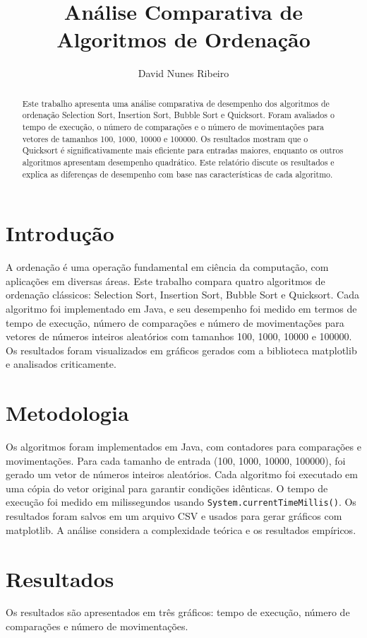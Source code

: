 \documentclass[12pt]{article}
\begin{document}
	
	\title{Análise Comparativa de Algoritmos de Ordenação}
	\author{David Nunes Ribeiro}
	\maketitle
	
	\begin{abstract}
		Este trabalho apresenta uma análise comparativa de desempenho dos algoritmos de ordenação Selection Sort, Insertion Sort, Bubble Sort e Quicksort. Foram avaliados o tempo de execução, o número de comparações e o número de movimentações para vetores de tamanhos 100, 1000, 10000 e 100000. Os resultados mostram que o Quicksort é significativamente mais eficiente para entradas maiores, enquanto os outros algoritmos apresentam desempenho quadrático. Este relatório discute os resultados e explica as diferenças de desempenho com base nas características de cada algoritmo.
	\end{abstract}
	
	\section{Introdução}
	A ordenação é uma operação fundamental em ciência da computação, com aplicações em diversas áreas. Este trabalho compara quatro algoritmos de ordenação clássicos: Selection Sort, Insertion Sort, Bubble Sort e Quicksort. Cada algoritmo foi implementado em Java, e seu desempenho foi medido em termos de tempo de execução, número de comparações e número de movimentações para vetores de números inteiros aleatórios com tamanhos 100, 1000, 10000 e 100000. Os resultados foram visualizados em gráficos gerados com a biblioteca matplotlib e analisados criticamente.
	
	\section{Metodologia}
	Os algoritmos foram implementados em Java, com contadores para comparações e movimentações. Para cada tamanho de entrada (100, 1000, 10000, 100000), foi gerado um vetor de números inteiros aleatórios. Cada algoritmo foi executado em uma cópia do vetor original para garantir condições idênticas. O tempo de execução foi medido em milissegundos usando \texttt{System.currentTimeMillis()}. Os resultados foram salvos em um arquivo CSV e usados para gerar gráficos com matplotlib. A análise considera a complexidade teórica e os resultados empíricos.
	
	\section{Resultados}
	Os resultados são apresentados em três gráficos: tempo de execução, número de comparações e número de movimentações.
	
\end{document}

